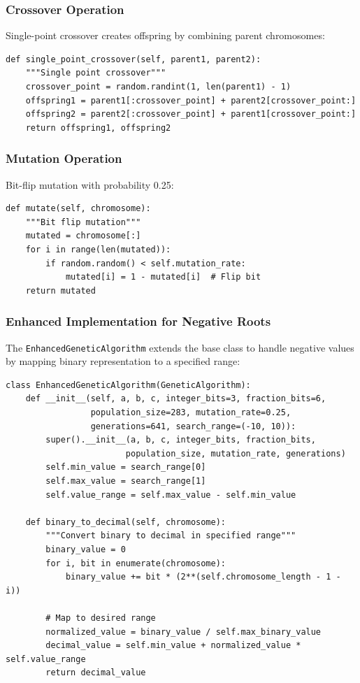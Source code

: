\documentclass[11pt,a4paper]{article}
\begin{document}
\subsubsection{Crossover Operation}

Single-point crossover creates offspring by combining parent chromosomes:

\begin{verbatim}
def single_point_crossover(self, parent1, parent2):
    """Single point crossover"""
    crossover_point = random.randint(1, len(parent1) - 1)
    offspring1 = parent1[:crossover_point] + parent2[crossover_point:]
    offspring2 = parent2[:crossover_point] + parent1[crossover_point:]
    return offspring1, offspring2
\end{verbatim}

\subsubsection{Mutation Operation}

Bit-flip mutation with probability 0.25:

\begin{verbatim}
def mutate(self, chromosome):
    """Bit flip mutation"""
    mutated = chromosome[:]
    for i in range(len(mutated)):
        if random.random() < self.mutation_rate:
            mutated[i] = 1 - mutated[i]  # Flip bit
    return mutated
\end{verbatim}

\subsubsection{Enhanced Implementation for Negative Roots}

The \texttt{EnhancedGeneticAlgorithm} extends the base class to handle negative values by mapping binary representation to a specified range:

\begin{verbatim}
class EnhancedGeneticAlgorithm(GeneticAlgorithm):
    def __init__(self, a, b, c, integer_bits=3, fraction_bits=6, 
                 population_size=283, mutation_rate=0.25, 
                 generations=641, search_range=(-10, 10)):
        super().__init__(a, b, c, integer_bits, fraction_bits, 
                        population_size, mutation_rate, generations)
        self.min_value = search_range[0]
        self.max_value = search_range[1]
        self.value_range = self.max_value - self.min_value
    
    def binary_to_decimal(self, chromosome):
        """Convert binary to decimal in specified range"""
        binary_value = 0
        for i, bit in enumerate(chromosome):
            binary_value += bit * (2**(self.chromosome_length - 1 - i))
        
        # Map to desired range
        normalized_value = binary_value / self.max_binary_value
        decimal_value = self.min_value + normalized_value * self.value_range
        return decimal_value
\end{verbatim}
\end{document}
